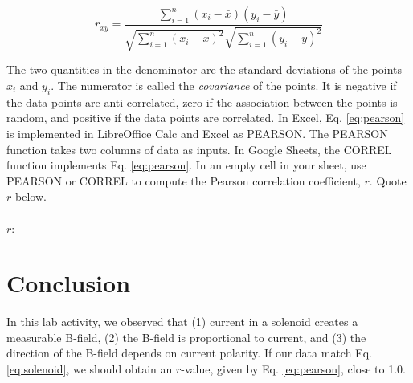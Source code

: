 \documentclass[12pt]{article}
\begin{document}
\begin{equation}
r_{xy} = \frac{\sum_{i=1}^{n}(x_i - \bar{x})(y_i - \bar{y})}{\sqrt{\sum_{i=1}^{n}(x_i-\bar{x})^2}\sqrt{\sum_{i=1}^{n}(y_i-\bar{y})^2}} \label{eq:pearson}
\end{equation}

\noindent
The two quantities in the denominator are the standard deviations of the points $x_i$ and $y_i$.  The numerator is called the \textit{covariance} of the points.  It is negative if the data points are anti-correlated, zero if the association between the points is random, and positive if the data points are correlated.  In Excel, Eq. \ref{eq:pearson} is implemented in LibreOffice Calc and Excel as PEARSON.  The PEARSON function takes two columns of data as inputs.  In Google Sheets, the CORREL function implements Eq. \ref{eq:pearson}.  In an empty cell in your sheet, use PEARSON or CORREL to compute the Pearson correlation coefficient, $r$.  Quote $r$ below. \\ \\

\noindent
$r$: \underline{~~~~~~~~~~~~~~~~~~}

\section{Conclusion}

In this lab activity, we observed that (1) current in a solenoid creates a measurable B-field, (2) the B-field is proportional to current, and (3) the direction of the B-field depends on current polarity.  If our data match Eq. \ref{eq:solenoid}, we should obtain an $r$-value, given by Eq. \ref{eq:pearson}, close to 1.0.
\end{document}
